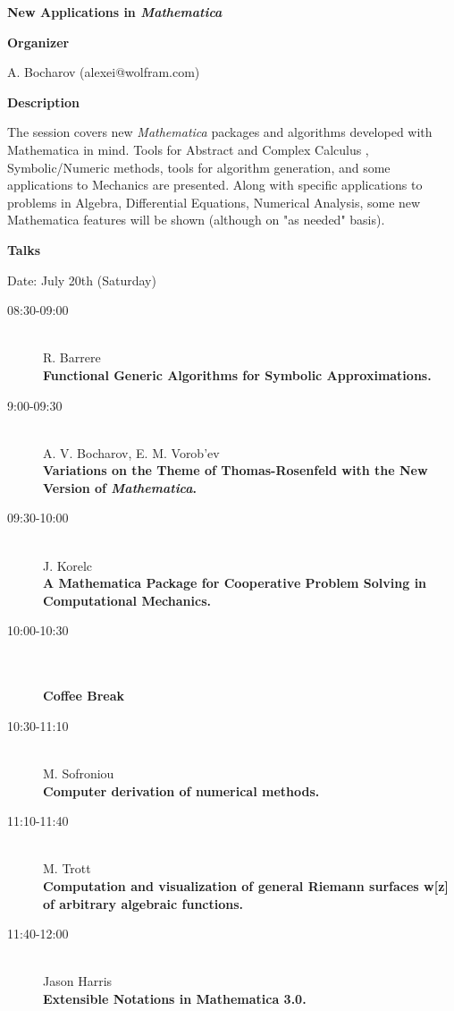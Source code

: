 \begin{center}
{\LARGE \bf New Applications in {\em Mathematica}}
\end{center}
\bigskip

\noindent
{\bf Organizer}
\medskip

A. Bocharov (alexei@wolfram.com)

\bigskip

\noindent
{\bf Description}
\medskip

The session covers new {\em Mathematica} packages and algorithms developed with Mathematica in
mind. Tools for Abstract and Complex Calculus , Symbolic/Numeric methods, tools for algorithm
generation, and some applications to Mechanics are presented. Along with specific applications to
problems in Algebra, Differential Equations, Numerical Analysis, some new Mathematica
features will be shown (although on "as needed" basis). 

\bigskip
\noindent
{\bf Talks}
\medskip

Date: July 20th (Saturday) 

\begin{description}
\item[08:30-09:00] \ \\
  R. Barrere\\
  {\bf Functional Generic Algorithms for Symbolic Approximations.} 
\item[9:00-09:30] \ \\
  A. V. Bocharov, E. M. Vorob'ev\\
  {\bf Variations on the Theme of Thomas-Rosenfeld with the New
    Version of {\em Mathematica}.} 
\item[09:30-10:00] \ \\
  J. Korelc\\
  {\bf A Mathematica Package for Cooperative Problem Solving in Computational
    Mechanics.} 
\item[10:00-10:30] \ \\
  \\
  {\bf Coffee Break} 
\item[10:30-11:10 ] \ \\
  M. Sofroniou\\
  {\bf Computer derivation of numerical methods.} 
\item[11:10-11:40] \ \\
  M. Trott\\
  {\bf Computation and visualization of general Riemann surfaces w[z] of arbitrary algebraic
    functions.} 
\item[11:40-12:00] \ \\
  Jason Harris\\
  {\bf Extensible Notations in Mathematica 3.0.} 
\end{description}

